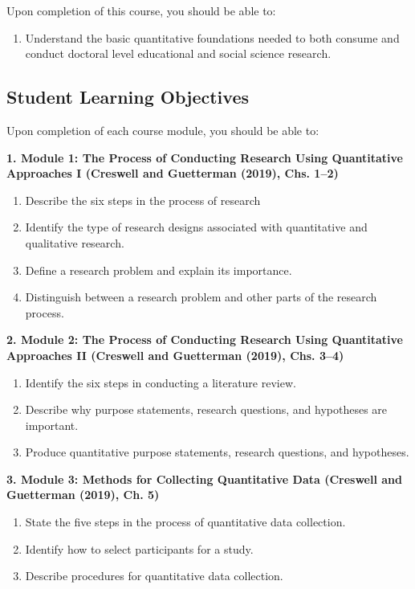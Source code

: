 \documentclass[
]{article}
\providecommand{\tightlist}{%
  \setlength{\itemsep}{0pt}\setlength{\parskip}{0pt}}
\begin{document}
Upon completion of this course, you should be able to:

\begin{enumerate}
\def\labelenumi{\arabic{enumi}.}
\tightlist
\item
  Understand the basic quantitative foundations needed to both consume
  and conduct doctoral level educational and social science research.
\end{enumerate}

\subsection{Student Learning Objectives}

Upon completion of each course module, you should be able to:

\textbf{1. Module 1: The Process of Conducting Research Using
Quantitative Approaches I (Creswell and Guetterman (2019), Chs. 1--2)}

\begin{enumerate}
\def\labelenumi{\arabic{enumi}.}
\tightlist
\item
  Describe the six steps in the process of research
\item
  Identify the type of research designs associated with quantitative and
  qualitative research.
\item
  Define a research problem and explain its importance.
\item
  Distinguish between a research problem and other parts of the research
  process.
\end{enumerate}

\textbf{2. Module 2: The Process of Conducting Research Using
Quantitative Approaches II (Creswell and Guetterman (2019), Chs. 3--4)}

\begin{enumerate}
\def\labelenumi{\arabic{enumi}.}
\tightlist
\item
  Identify the six steps in conducting a literature review.
\item
  Describe why purpose statements, research questions, and hypotheses
  are important.
\item
  Produce quantitative purpose statements, research questions, and
  hypotheses.
\end{enumerate}

\textbf{3. Module 3: Methods for Collecting Quantitative Data (Creswell
and Guetterman (2019), Ch. 5)}

\begin{enumerate}
\def\labelenumi{\arabic{enumi}.}
\tightlist
\item
  State the five steps in the process of quantitative data collection.
\item
  Identify how to select participants for a study.
\item
  Describe procedures for quantitative data collection.
\end{enumerate}
\end{document}
